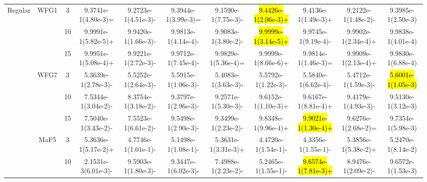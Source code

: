 \documentclass[a4paper,fleqn]{cas-dc}
\newcommand{\highlight}[1]{
	\begingroup
	\sethlcolor{Seashell}%
	\hl{#1}%
	\endgroup
}
\begin{document}
\begin{sloppypar}
\begin{table}[ht]
{\begin{tabular}{ccccccccccc}
					
					
					
					
					\midrule[0.35pt]
					\multirow{9}{*}{Regular}&\multirow{3}{*}{WFG1} &3 &9.3741e-1(4.80e-3)=		&9.2723e-1(4.51e-3)-	&9.3944e-1(3.99e-3)=	&9.1590e-1(7.75e-3)-	&\highlight{9.4426e-1(2.06e-3)+}	&9.4136e-1(1.49e-3)+	&9.2122e-1(1.48e-2)-	&9.3985e-1(2.50e-3)\\ 
					
					\multirow{9}{*}{~}&\multirow{3}{*}{~} &10  &9.9991e-1(5.82e-5)+		&9.9420e-1(1.66e-3)-	&9.9813e-1(4.14e-4)-	&9.9083e-1(3.80e-2)-	&\highlight{9.9999e-1(3.14e-5)+}	&9.9745e-1(9.19e-4)-	&9.9902e-1(2.34e-4)+	&9.9838e-1(4.01e-4)\\
					
					\multirow{9}{*}{~}&\multirow{3}{*}{~} &15 &9.9951e-1(5.08e-4)+		&9.9221e-1(2.72e-3)-	&9.9712e-1(7.45e-4)-	&9.9829e-1(5.36e-4)=	&9.9999e-1(8.66e-6)+	&9.9814e-1(1.46e-3)=	&9.9909e-1(2.13e-4)+	&9.9830e-1(6.88e-4)\\
					
					
					
					
					
					\multirow{9}{*}{~}&\multirow{3}{*}{WFG7} &3 &5.3639e-1(2.78e-3)-	&5.5252e-1(2.64e-3)-	&5.5915e-1(1.06e-3)-	&5.4083e-1(3.63e-3)-	&5.5792e-1(1.22e-3)-	&5.5840e-1(6.62e-4)-	&5.4712e-1(1.59e-3)-	&\highlight{5.6001e-1(1.05e-3)}\\ 
					
					\multirow{9}{*}{~}&\multirow{3}{*}{~} &10 	&7.5344e-1(3.04e-2)-		&8.3754e-1(3.18e-2)-	&9.3797e-1(2.96e-3)-	&9.2571e-1(5.30e-3)-	&9.6152e-1(1.10e-3)+	&9.6167e-1(8.81e-4)+	&9.4179e-1(4.93e-3)-	&9.5130e-1(3.12e-3)\\
					
					\multirow{9}{*}{~}&\multirow{3}{*}{~} &15 	&7.5040e-1(3.43e-2)-		&7.5523e-1(6.61e-2)-	&9.5498e-1(2.90e-3)-	&9.3499e-1(2.23e-2)-	&9.8348e-1(9.96e-4)+	&\highlight{9.9021e-1(1.30e-4)+}	&9.6276e-1(2.68e-2)=	&9.7354e-1(5.98e-3)\\
					
					
					
					
					
					\multirow{9}{*}{~}&\multirow{3}{*}{MaF5} &3&5.3636e-1(5.17e-2)+		&4.7746e-1(1.01e-1)-	&5.1498e-1(1.08e-1)-	&5.3631e-1(3.31e-3)+	&4.4720e-1(1.54e-1)-	&4.3356e-1(1.55e-1)-	&5.3856e-1(5.38e-2)+	&5.2470e-1(8.14e-2)\\
					
					\multirow{9}{*}{~}&\multirow{3}{*}{~} &10 &2.1531e-3(6.01e-3)-		&9.5903e-1(1.80e-3)-	&9.3447e-1(6.02e-3)-	&7.4988e-1(2.23e-2)-	&5.2465e-1(1.55e-1)-	&\highlight{9.6574e-1(7.81e-3)+}	&8.9476e-1(2.09e-2)-	&9.6572e-1(1.53e-3)\\
					

\end{tabular}}
\end{table}
\end{sloppypar}
\end{document}
